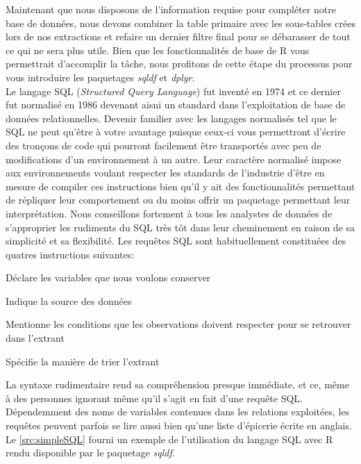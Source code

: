 \vspace{\baselineskip}
\noindent
Maintenant que nous disposons de l'information requise pour compléter notre base de données, nous devons combiner la table primaire avec les sous-tables crées lors de nos extractions et refaire un dernier filtre final pour se débarasser de tout ce qui ne sera plus utile. Bien que les fonctionnalités de base de R vous permettrait d'accomplir la tâche, nous profitons de cette étape du processus pour vous introduire les paquetages \emph{sqldf} et \emph{dplyr}. \\

\noindent
Le langage SQL (\emph{Structured Query Language}) fut inventé en 1974 et ce dernier fut normalisé en 1986 devenant aisni un standard dans l'exploitation de base de données relationnelles. Devenir familier avec les langages normalisés tel que le SQL ne peut qu'être à votre avantage puisque ceux-ci vous permettront d'écrire des tronçons de code qui pourront facilement être transportés avec peu de modifications d'un environnement à un autre. Leur caractère normalisé impose aux environnements voulant respecter les standards de l'industrie d'être en mesure de compiler ces instructions bien qu'il y ait des fonctionnalités permettant de répliquer leur comportement ou du moins offrir un paquetage permettant leur interprétation. \cite{SQL} Nous conseillons fortement à tous les analystes de données de s'approprier les rudiments du SQL très tôt dans leur cheminement en raison de sa simplicité et sa flexibilité. Les requêtes SQL sont habituellement constituées des quatres instructions suivantes: \\

\begin{description}[style=multiline,leftmargin=2cm]
	\item[Select] Déclare les variables que nous voulons conserver
	\item[From] Indique la source des données
	\item[Where] Mentionne les conditions que les observations doivent respecter pour se retrouver dans l'extrant
	\item[Order by] Spécifie la manière de trier l'extrant
\end{description}

\noindent
La syntaxe rudimentaire rend sa compréhension presque immédiate, et ce, même à des personnes ignorant même qu'il s'agit en fait d'une requête SQL. Dépendemment des noms de variables contenues dans les relations exploitées, les requêtes peuvent parfois se lire aussi bien qu'une liste d'épicerie écrite en anglais. Le \autoref{src:simpleSQL} fourni un exemple de l'utilisation du langage SQL avec R rendu disponible par le paquetage \emph{sqldf}.

